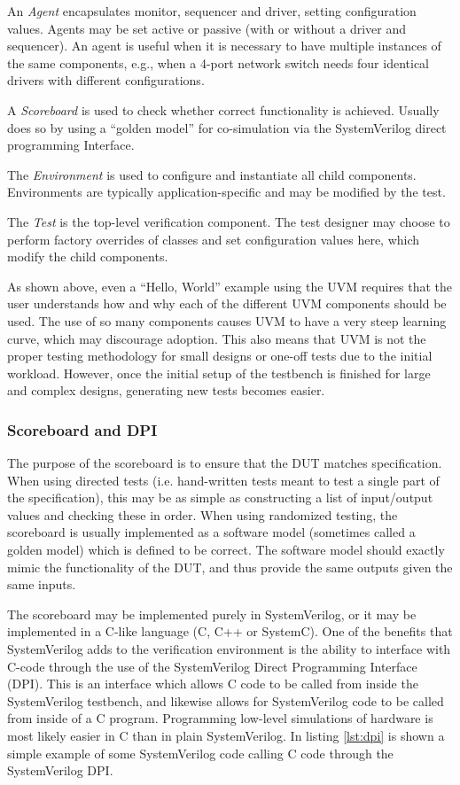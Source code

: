 \documentclass[conference]{IEEEtran}
\newcommand{\SV}{SystemVerilog\xspace}
\begin{document}
    An \textit{Agent} encapsulates monitor, sequencer and driver, setting configuration values. Agents may be set active or passive (with or without a driver and sequencer). An agent is useful when it is necessary to have multiple instances of the same components, e.g., when a 4-port network switch needs four identical drivers with different configurations.
    
    A \textit{Scoreboard} is used to check whether correct functionality is achieved. Usually does so by using a ``golden model'' for co-simulation via the SystemVerilog direct programming Interface.
    
    The \textit{Environment} is used to configure and instantiate all child components. Environments are typically application-specific and may be modified by the test.
    
    The \textit{Test} is the top-level verification component. The test designer may choose to perform factory overrides of classes and set configuration values here, which modify the child components.

As shown above, even a ``Hello, World'' example using the UVM requires that the user understands how and why each of the different UVM components should be used. The use of so many components causes UVM to have a very steep learning curve, which may discourage adoption. This also means that UVM is not the proper testing methodology for small designs or one-off tests due to the initial workload.
However, once the initial setup of the testbench is finished for large and complex designs, generating new tests becomes easier.

\subsubsection{Scoreboard and DPI}
The purpose of the scoreboard is to ensure that the DUT matches specification. When using directed tests (i.e. hand-written tests meant to test a single part of the specification), this may be as simple as constructing a list of input/output values and checking these in order. When using randomized testing, the scoreboard is usually implemented as a software model (sometimes called a golden model) which is defined to be correct. The software model should exactly mimic the functionality of the DUT, and thus provide the same outputs given the same inputs. 

The scoreboard may be implemented purely in SystemVerilog, or it may be implemented in a C-like language (C, C++ or SystemC). One of the benefits that \SV adds to the verification environment is the ability to interface with C-code through the use of the \SV Direct Programming Interface (DPI). This is an interface which allows C code to be called from inside the \SV testbench, and likewise allows for \SV code to be called from inside of a C program. Programming low-level simulations of hardware is most likely easier in C than in plain \SV. In listing \ref{lst:dpi} is shown a simple example of some SystemVerilog code calling C code through the \SV DPI. 
\end{document}
